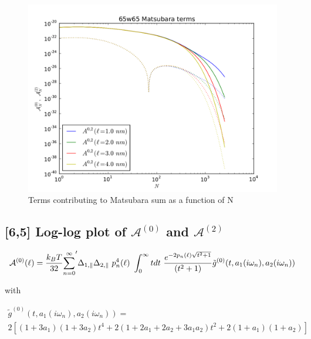 \documentclass[a4paper]{article}
\begin{document}
\begin{center}
\begin{figure}[t!]
\begin{center}
\includegraphics[width=1.2\textwidth]{large_N/65_A_vs_lrg_n.png}
\hskip 43pt
\caption{Terms contributing to Matsubara sum as a function of N}
\label{eiz65}
\end{center}
\end{figure} 

\subsection{[6,5] Log-log plot of $\mathcal{A}^{(0)}$ and $\mathcal{A}^{(2)}$ }
\begin{equation}
{\cal A}^{(0)}(\ell) = \frac{k_BT}{32}  {\sum_{n=0}^{\infty}}' \Delta_{1,\parallel} \Delta_{2,\parallel} ~p_n^{4}(\ell) ~\int_0^{\infty} t dt ~\frac{e^{- 2 p_n(\ell) \sqrt{t^{2} + 1}}}{(t^{2} + 1)} \tilde g^{(0)}(t, a_1(i \omega_n), a_2(i \omega_n))
\end{equation}

with

\begin{multline*}
\tilde g^{(0)}(t, a_1(i \omega_n), a_2(i \omega_n)) = \\ 
2 \left[ (1+3a_1)(1+3a_2) t^{4} + 2 (1+2a_1+2a_2+3a_1a_2) t^{2}  + 2(1+a_1)(1+a_2)\right]
\end{multline*}


\end{center}
\end{document}
